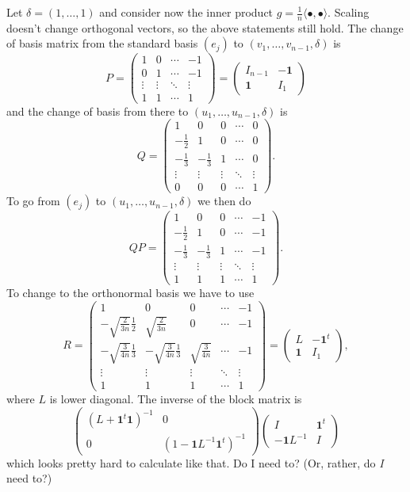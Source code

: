 \documentclass[11pt]{amsart}
\theoremstyle{definition}
\def\<{\langle}
\def\>{\rangle}
\begin{document}
Let $\delta = (1,\ldots,1)$ and consider now the inner product $g = \frac1n \<\bullet, \bullet\>$.
Scaling doesn't change orthogonal vectors, so the above statements still hold.
The change of basis matrix from the standard basis $(e_j)$ to $(v_1, \ldots, v_{n-1}, \delta)$ is
\[
P = \begin{pmatrix}
1 & 0 & \cdots & -1
\\
0 & 1 & \cdots & -1
\\
\vdots & \vdots & \ddots & \vdots
\\
1 & 1 & \cdots & 1
\end{pmatrix}
=
\begin{pmatrix}
I_{n-1} & - \mathbf{1}
\\
\mathbf{1} & I_1
\end{pmatrix}
\]
and the change of basis from there to $(u_1, \ldots, u_{n-1}, \delta)$ is
\[
Q = \begin{pmatrix}
1 & 0 & 0 & \cdots & 0
\\
-\frac12 & 1 & 0 & \cdots & 0
\\
-\frac13 & -\frac13 & 1 & \cdots & 0
\\
\vdots & \vdots & \vdots & \ddots & \vdots
\\
0 & 0 & 0 & \cdots & 1
\end{pmatrix}.
\]
To go from $(e_j)$ to $(u_1,\ldots,u_{n-1},\delta)$ we then do
\[
QP = \begin{pmatrix}
1 & 0 & 0 & \cdots & -1
\\
-\frac12 & 1 & 0 & \cdots & -1
\\
-\frac13 & -\frac13 & 1 & \cdots & -1
\\
\vdots & \vdots & \vdots & \ddots & \vdots
\\
1 & 1 & 1 & \cdots & 1
\end{pmatrix}.
\]
To change to the orthonormal basis we have to use
\def\tmpn#1#2{\sqrt{\frac{#1}{#2 n}}}
\[
R = \begin{pmatrix}
1 & 0 & 0 & \cdots & -1
\\
-\tmpn23 \frac12 & \tmpn23 & 0 & \cdots & -1
\\
-\tmpn34 \frac13 & -\tmpn34 \frac13 & \tmpn34  & \cdots & -1
\\
\vdots & \vdots & \vdots & \ddots & \vdots
\\
1 & 1 & 1 & \cdots & 1
\end{pmatrix}
= \begin{pmatrix}
L & -\mathbf{1}^t
\\
\mathbf{1} & I_1
\end{pmatrix},
\]
where $L$ is lower diagonal.
The inverse of the block matrix is
\[
\begin{pmatrix}
(L + \mathbf{1}^t \mathbf{1})^{-1}
& 0
\\
0 & (1 - \mathbf{1} L^{-1} \mathbf{1}^t)^{-1}
\end{pmatrix}
\begin{pmatrix}
I & \mathbf{1}^t
\\
-\mathbf{1} L^{-1} & I
\end{pmatrix}
\]
which looks pretty hard to calculate like that.
Do I need to? (Or, rather, do \emph{I} need to?)
\end{document}
